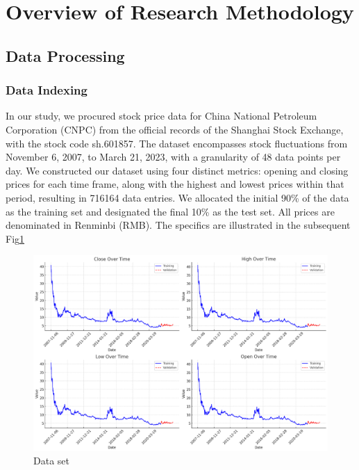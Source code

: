 \documentclass[sn-mathphys,Numbered]{sn-jnl}
\theoremstyle{thmstyleone}%
\theoremstyle{thmstyletwo}%
\theoremstyle{thmstylethree}%
\begin{document}
\section{Overview of Research Methodology}\label{sec3}

\subsection{Data Processing}\label{subsec1}

\subsubsection{Data Indexing}\label{subsubsec1}

In our study, we procured stock price data for China National Petroleum Corporation (CNPC) from the official records of the Shanghai Stock Exchange, with the stock code sh.601857. The dataset encompasses stock fluctuations from November 6, 2007, to March 21, 2023, with a granularity of 48 data points per day. We constructed our dataset using four distinct metrics: opening and closing prices for each time frame, along with the highest and lowest prices within that period, resulting in 716164 data entries. We allocated the initial 90\% of the data as the training set and designated the final 10\% as the test set. All prices are denominated in Renminbi (RMB). The specifics are illustrated in the subsequent Fig\ref{dataset}

\begin{figure}[h]
    \centering
    \includegraphics[width=1\textwidth]{pngs/dataset.png}
    \caption{ Data set}
    \label{dataset}
\end{figure}
\end{document}
